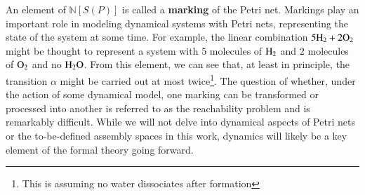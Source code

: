 \documentclass[aps,prd,onecolumn,nofootinbib,letterpaper,preprintnumbers,superscriptaddress,eqsecnum]{revtex4}
\theoremstyle{definition}
\newcommand{\N}{\mathbb{N}}
\begin{document}
\begin{center}
\end{center}

An element of $\N[S(P)]$ is called a \textbf{marking} of the Petri net.
Markings play an important role in modeling dynamical systems with Petri nets, representing the state of the system at some time.
For example, the linear combination $5\ce{H_2} + 2\ce{O_2}$ might be thought to represent a system with $5$ molecules of $\ce{H_2}$ and $2$ molecules of $\ce{O_2}$ and no $\ce{H_2O}$.
From this element, we can see that, at least in principle, the transition $\alpha$ might be carried out at most twice\footnote{This is assuming no water dissociates after formation}.
The question of whether, under the action of some dynamical model, one marking can be transformed or processed into another is referred to as the reachability problem and is remarkably difficult.
While we will not delve into dynamical aspects of Petri nets or the to-be-defined assembly spaces in this work, dynamics will likely be a key element of the formal theory going forward.
\end{document}
